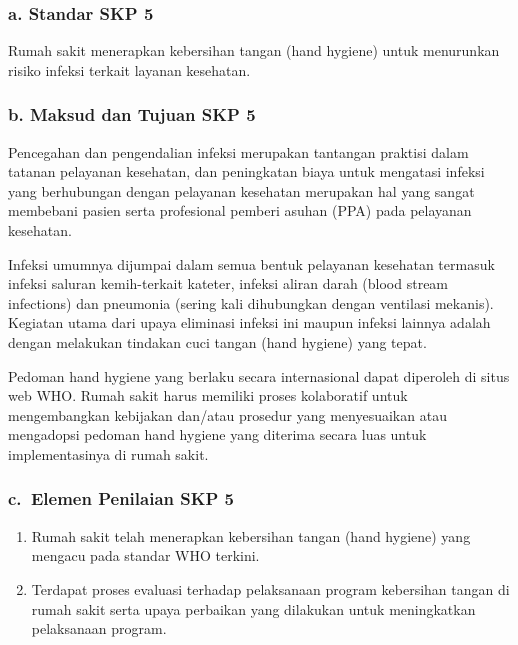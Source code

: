 \documentclass[
]{book}
\providecommand{\tightlist}{%
  \setlength{\itemsep}{0pt}\setlength{\parskip}{0pt}}
\begin{document}
\hypertarget{a.-standar-skp-5}{%
\subsubsection*{a. Standar SKP 5}\label{a.-standar-skp-5}}

Rumah sakit menerapkan kebersihan tangan (hand hygiene) untuk menurunkan risiko infeksi terkait layanan kesehatan.

\hypertarget{b.-maksud-dan-tujuan-skp-5}{%
\subsubsection*{b. Maksud dan Tujuan SKP 5}\label{b.-maksud-dan-tujuan-skp-5}}

Pencegahan dan pengendalian infeksi merupakan tantangan praktisi dalam tatanan pelayanan kesehatan, dan peningkatan biaya untuk mengatasi infeksi yang berhubungan dengan pelayanan kesehatan merupakan hal yang sangat membebani pasien serta profesional pemberi asuhan (PPA) pada pelayanan kesehatan.

Infeksi umumnya dijumpai dalam semua bentuk pelayanan kesehatan termasuk infeksi saluran kemih-terkait kateter, infeksi aliran darah (blood stream infections) dan pneumonia (sering kali dihubungkan dengan ventilasi mekanis). Kegiatan utama dari upaya eliminasi infeksi ini maupun infeksi lainnya adalah dengan melakukan tindakan cuci tangan (hand hygiene) yang tepat.

Pedoman hand hygiene yang berlaku secara internasional dapat diperoleh di situs web WHO. Rumah sakit harus memiliki proses kolaboratif untuk mengembangkan kebijakan dan/atau prosedur yang menyesuaikan atau mengadopsi pedoman hand hygiene yang diterima secara luas untuk implementasinya di rumah sakit.

\hypertarget{c.-elemen-penilaian-skp-5}{%
\subsubsection*{c.~Elemen Penilaian SKP 5}\label{c.-elemen-penilaian-skp-5}}

\begin{enumerate}
\def\labelenumi{\arabic{enumi}.}
\tightlist
\item
  Rumah sakit telah menerapkan kebersihan tangan (hand hygiene) yang mengacu pada standar WHO terkini.
\item
  Terdapat proses evaluasi terhadap pelaksanaan program kebersihan tangan di rumah sakit serta upaya perbaikan yang dilakukan untuk meningkatkan pelaksanaan program.
\end{enumerate}
\end{document}
